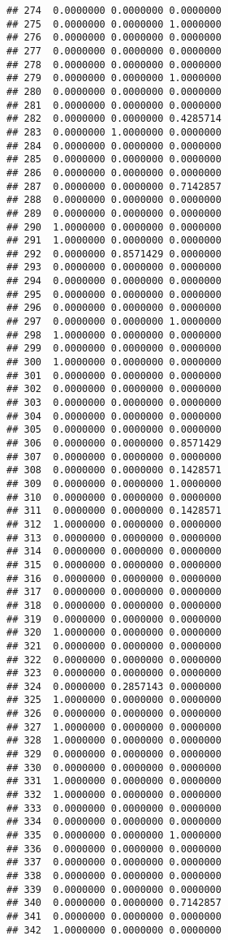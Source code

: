 \documentclass[
]{article}
\begin{document}
\begin{verbatim}
## 274  0.0000000 0.0000000 0.0000000
## 275  0.0000000 0.0000000 1.0000000
## 276  0.0000000 0.0000000 0.0000000
## 277  0.0000000 0.0000000 0.0000000
## 278  0.0000000 0.0000000 0.0000000
## 279  0.0000000 0.0000000 1.0000000
## 280  0.0000000 0.0000000 0.0000000
## 281  0.0000000 0.0000000 0.0000000
## 282  0.0000000 0.0000000 0.4285714
## 283  0.0000000 1.0000000 0.0000000
## 284  0.0000000 0.0000000 0.0000000
## 285  0.0000000 0.0000000 0.0000000
## 286  0.0000000 0.0000000 0.0000000
## 287  0.0000000 0.0000000 0.7142857
## 288  0.0000000 0.0000000 0.0000000
## 289  0.0000000 0.0000000 0.0000000
## 290  1.0000000 0.0000000 0.0000000
## 291  1.0000000 0.0000000 0.0000000
## 292  0.0000000 0.8571429 0.0000000
## 293  0.0000000 0.0000000 0.0000000
## 294  0.0000000 0.0000000 0.0000000
## 295  0.0000000 0.0000000 0.0000000
## 296  0.0000000 0.0000000 0.0000000
## 297  0.0000000 0.0000000 1.0000000
## 298  1.0000000 0.0000000 0.0000000
## 299  0.0000000 0.0000000 0.0000000
## 300  1.0000000 0.0000000 0.0000000
## 301  0.0000000 0.0000000 0.0000000
## 302  0.0000000 0.0000000 0.0000000
## 303  0.0000000 0.0000000 0.0000000
## 304  0.0000000 0.0000000 0.0000000
## 305  0.0000000 0.0000000 0.0000000
## 306  0.0000000 0.0000000 0.8571429
## 307  0.0000000 0.0000000 0.0000000
## 308  0.0000000 0.0000000 0.1428571
## 309  0.0000000 0.0000000 1.0000000
## 310  0.0000000 0.0000000 0.0000000
## 311  0.0000000 0.0000000 0.1428571
## 312  1.0000000 0.0000000 0.0000000
## 313  0.0000000 0.0000000 0.0000000
## 314  0.0000000 0.0000000 0.0000000
## 315  0.0000000 0.0000000 0.0000000
## 316  0.0000000 0.0000000 0.0000000
## 317  0.0000000 0.0000000 0.0000000
## 318  0.0000000 0.0000000 0.0000000
## 319  0.0000000 0.0000000 0.0000000
## 320  1.0000000 0.0000000 0.0000000
## 321  0.0000000 0.0000000 0.0000000
## 322  0.0000000 0.0000000 0.0000000
## 323  0.0000000 0.0000000 0.0000000
## 324  0.0000000 0.2857143 0.0000000
## 325  1.0000000 0.0000000 0.0000000
## 326  0.0000000 0.0000000 0.0000000
## 327  1.0000000 0.0000000 0.0000000
## 328  1.0000000 0.0000000 0.0000000
## 329  0.0000000 0.0000000 0.0000000
## 330  0.0000000 0.0000000 0.0000000
## 331  1.0000000 0.0000000 0.0000000
## 332  1.0000000 0.0000000 0.0000000
## 333  0.0000000 0.0000000 0.0000000
## 334  0.0000000 0.0000000 0.0000000
## 335  0.0000000 0.0000000 1.0000000
## 336  0.0000000 0.0000000 0.0000000
## 337  0.0000000 0.0000000 0.0000000
## 338  0.0000000 0.0000000 0.0000000
## 339  0.0000000 0.0000000 0.0000000
## 340  0.0000000 0.0000000 0.7142857
## 341  0.0000000 0.0000000 0.0000000
## 342  1.0000000 0.0000000 0.0000000

\end{verbatim}
\end{document}
